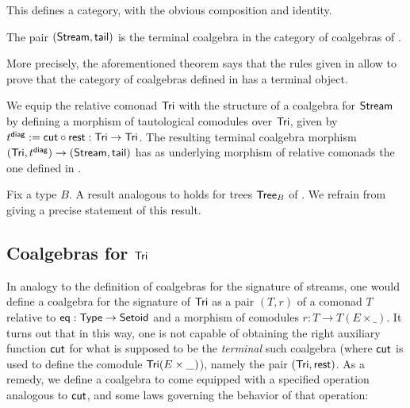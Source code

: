 \documentclass[envcountsame]{llncs}
\begin{document}
This defines a category, with the obvious composition and identity. 

\begin{theorem}\label{thm_stream_terminal}
 The pair $(\mathsf{Stream}, \mathsf{tail})$ is the terminal coalgebra in the category of coalgebras of .
\end{theorem}

More precisely, the aforementioned theorem says that the rules given in  allow to prove that
the category of coalgebras defined in  has a terminal object.

\begin{example}
  We equip the relative comonad $\mathsf{Tri}$ with the structure of a coalgebra for $\mathsf{Stream}$ by defining a 
  morphism of tautological comodules over $\mathsf{Tri}$, given by
   $ t^{\mathsf{diag}} := {\mathsf{cut}} \circ {\ensuremath{\mathsf{rest}}}  : \mathsf{Tri} \to \mathsf{Tri}$.
  The resulting terminal coalgebra morphism
   $(\mathsf{Tri}, t^{\mathsf{diag}}) \to (\mathsf{Stream}, \mathsf{tail})$ has as underlying morphism of relative comonads the one defined in .
\end{example}

\begin{Long}
 
\begin{remark}
 Fix a type $B$. A result analogous to  holds for trees $\mathsf{Tree}_B$ of . 
 We refrain from giving a precise statement of this result.
\end{remark}

\end{Long}

\begin{Long}
\subsection{Coalgebras for $\mathsf{Tri}$}
\end{Long}

In analogy to the definition of coalgebras for the signature of streams, one would define
a coalgebra for the signature of $\mathsf{Tri}$ as a pair $(T,r)$ of a comonad $T$ relative to $\mathsf{eq} : \mathsf{Type} \to \mathsf{Setoid}$ and 
a morphism of comodules $r : T \to T(E\times \_)$. 
It turns out that in this way, one is not capable of obtaining the right auxiliary function $\mathsf{cut}$ for what is
supposed to be the \emph{terminal} such coalgebra (where $\mathsf{cut}$ is used to define the comodule $\mathsf{Tri}(E\times \_)$), namely the pair $(\mathsf{Tri},\mathsf{rest})$.
As a remedy, we define a coalgebra to come equipped with a specified operation analogous to $\mathsf{cut}$, and some laws governing
the behavior of that operation:
\end{document}

